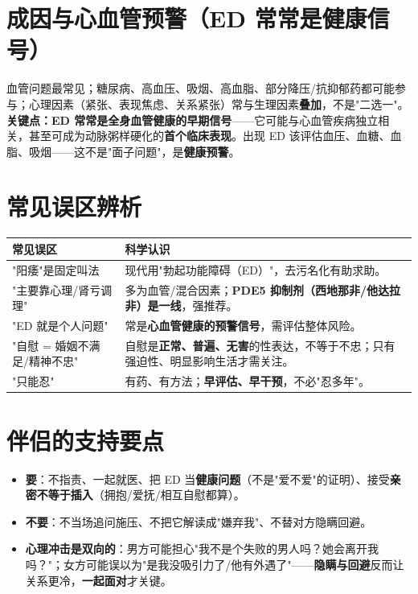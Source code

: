 \documentclass[12pt,UTF8,openany]{ctexbook}
\begin{document}
\section{成因与心血管预警（ED 常常是健康信号）}
血管问题最常见；糖尿病、高血压、吸烟、高血脂、部分降压/抗抑郁药都可能参与；心理因素（紧张、表现焦虑、关系紧张）常与生理因素\textbf{叠加}，不是"二选一"。
\textbf{关键点：ED 常常是全身血管健康的早期信号}——它可能与心血管疾病独立相关，甚至可成为动脉粥样硬化的\textbf{首个临床表现}。出现 ED 该评估血压、血糖、血脂、吸烟——这不是"面子问题"，是\textbf{健康预警}。

\section{常见误区辨析}
\begin{tabularx}{\textwidth}{l X}
\toprule
\textbf{常见误区} & \textbf{科学认识} \\
\midrule
"阳痿"是固定叫法 & 现代用"勃起功能障碍（ED）"，去污名化有助求助。 \\
"主要靠心理/肾亏调理" & 多为血管/混合因素；\textbf{PDE5 抑制剂（西地那非/他达拉非）是一线}，强推荐。 \\
"ED 就是个人问题" & 常是\textbf{心血管健康的预警信号}，需评估整体风险。 \\
"自慰 = 婚姻不满足/精神不忠" & 自慰是\textbf{正常、普遍、无害}的性表达，不等于不忠；只有强迫性、明显影响生活才需关注。 \\
"只能忍" & 有药、有方法；\textbf{早评估、早干预}，不必"忍多年"。 \\
\bottomrule
\end{tabularx}

\section{伴侣的支持要点}
\begin{itemize}[leftmargin=2em,itemsep=0.3em]
  \item \textbf{要}：不指责、一起就医、把 ED 当\textbf{健康问题}（不是"爱不爱"的证明）、接受\textbf{亲密不等于插入}（拥抱/爱抚/相互自慰都算）。
  \item \textbf{不要}：不当场追问施压、不把它解读成"嫌弃我"、不替对方隐瞒回避。
  \item \textbf{心理冲击是双向的}：男方可能担心"我不是个失败的男人吗？她会离开我吗？"；女方可能误以为"是我没吸引力了/他有外遇了"——\textbf{隐瞒与回避}反而让关系更冷，\textbf{一起面对}才关键。
\end{itemize}
\end{document}
